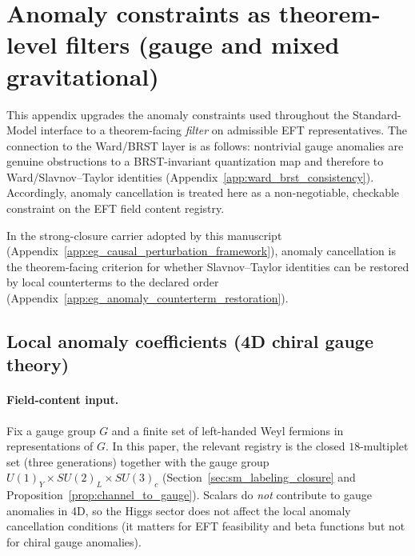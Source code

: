 \section{Anomaly constraints as theorem-level filters (gauge and mixed gravitational)}
\label{app:anomaly_theorem_filters}

This appendix upgrades the anomaly constraints used throughout the Standard-Model interface to a theorem-facing \emph{filter} on admissible EFT representatives.
The connection to the Ward/BRST layer is as follows:
nontrivial gauge anomalies are genuine obstructions to a BRST-invariant quantization map and therefore to Ward/Slavnov--Taylor identities (Appendix~\ref{app:ward_brst_consistency}).
Accordingly, anomaly cancellation is treated here as a non-negotiable, checkable constraint on the EFT field content registry.

\AuditTag In the strong-closure carrier adopted by this manuscript (Appendix~\ref{app:eg_causal_perturbation_framework}), anomaly cancellation is the theorem-facing criterion for whether Slavnov--Taylor identities can be restored by local counterterms to the declared order (Appendix~\ref{app:eg_anomaly_counterterm_restoration}).

\subsection{Local anomaly coefficients (4D chiral gauge theory)}

\paragraph{Field-content input.}
Fix a gauge group $G$ and a finite set of left-handed Weyl fermions in representations of $G$.
In this paper, the relevant registry is the closed $18$-multiplet set (three generations) together with the gauge group $U(1)_Y\times SU(2)_L\times SU(3)_c$ (Section~\ref{sec:sm_labeling_closure} and Proposition~\ref{prop:channel_to_gauge}).
Scalars do \emph{not} contribute to gauge anomalies in 4D, so the Higgs sector does not affect the local anomaly cancellation conditions (it matters for EFT feasibility and beta functions but not for chiral gauge anomalies).

